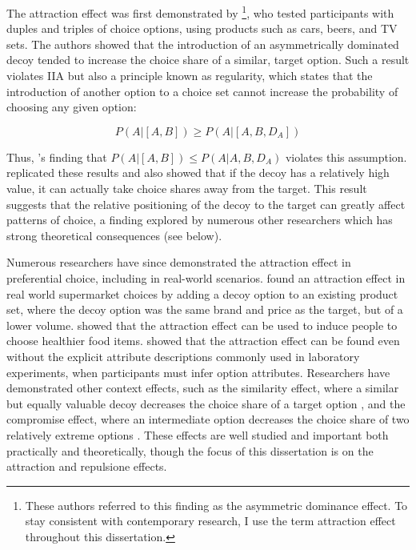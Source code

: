 The attraction effect was first demonstrated by \textcite{huberAddingAsymmetricallyDominated1982d} \footnote{These authors referred to this finding as the asymmetric dominance effect. To stay consistent with contemporary research, I use the term attraction effect throughout this dissertation.}, who tested participants with duples and triples of choice options, using products such as cars, beers, and TV sets. The authors showed that the introduction of an asymmetrically dominated decoy tended to increase the choice share of a similar, target option. Such a result violates IIA but also a principle known as regularity, which states that the introduction of another option to a choice set cannot increase the probability of choosing any given option:

\begin{equation}
  P(A|[A,B])\geq P(A|[A,B,D_{A}])
  \label{eqn:reg_att}
\end{equation}

Thus, \textcite{huberAddingAsymmetricallyDominated1982d}'s finding that $P(A|[A,B])\leq P(A|A,B,D_{A})$ violates this assumption. \textcite{huber1983market} replicated these results and also showed that if the decoy has a relatively high value, it can actually take choice shares away from the target. This result suggests that the relative positioning of the decoy to the target can greatly affect patterns of choice, a finding explored by numerous other researchers which has strong theoretical consequences (see below). 

Numerous researchers have since demonstrated the attraction effect in preferential choice, including in real-world scenarios. \textcite{doyleRobustnessAsymmetricallyDominated1999} found an attraction effect in real world supermarket choices by adding a decoy option to an existing product set, where the decoy option was the same brand and price as the target, but of a lower volume. \textcite{van2021attract} showed that the attraction effect can be used to induce people to choose healthier food items. \textcite{slaughterDecoyEffectsAttributelevel1999b} showed that the attraction effect can be found even without the explicit attribute descriptions commonly used in laboratory experiments, when participants must infer option attributes. Researchers have demonstrated other context effects, such as the similarity effect, where a similar but equally valuable decoy decreases the choice share of a target option \parencite{tverskyEliminationAspectsTheory1972}, and the compromise effect, where an intermediate option decreases the choice share of two relatively extreme options \parencite{simonsonChoiceBasedReasons1989b}. These effects are well studied and important both practically and theoretically, though the focus of this dissertation is on the attraction and repulsione effects.

